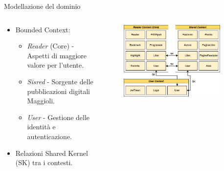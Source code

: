     \begin{frame}{Modellazione del dominio}
        \begin{columns}[onlytextwidth]
            \begin{column}{0.45\textwidth}
            \begin{itemize}
                \item Bounded Context:
                    \begin{itemize}
                        \item \textit{Reader} (Core) - Aspetti di maggiore valore per l'utente.
                        \item \textit{Sisred} - Sorgente delle pubblicazioni digitali Maggioli.
                        \item \textit{User} - Gestione delle identità e autenticazione.
                    \end{itemize}
                \item Relazioni Shared Kernel (SK) tra i contesti.
                \end{itemize}
            \end{column}
            \begin{column}{0.55\textwidth}
                \begin{figure}[H]
                \centering
                \includegraphics[width=0.9\textwidth]{img/tesi-20-app-domain.drawio.png}
                \end{figure}
            \end{column}
        \end{columns}
    \end{frame}

